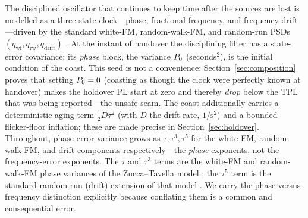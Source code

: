 The disciplined oscillator that continues to keep time after the sources are lost
is modelled as a three-state clock---phase, fractional frequency, and
frequency drift---driven by the standard white-FM, random-walk-FM, and
random-run PSDs $(q_{\mathrm{wf}},q_{\mathrm{rw}},q_{\mathrm{drift}})$
\citep{zucca2005,riley2008,ieee1139}. At the instant of handover the disciplining
filter has a state-error covariance; its \emph{phase} block, the variance
$P_0$ (seconds$^2$), is the initial condition of the coast. This seed is not a
convenience: Section~\ref{sec:composition} proves that setting $P_0=0$ (coasting
as though the clock were perfectly known at handover) makes the holdover PL start
at zero and thereby \emph{drop} below the TPL that was being reported---the unsafe
seam. The coast additionally carries a deterministic aging term
$\tfrac12 D\tau^{2}$ (with $D$ the drift rate, $1/\mathrm{s}^2$) and a bounded
flicker-floor inflation; these are made precise in Section~\ref{sec:holdover}.
Throughout, phase-error variance grows as $\tau,\tau^{3},\tau^{5}$ for the
white-FM, random-walk-FM, and drift components respectively---the \emph{phase}
exponents, not the frequency-error exponents. The $\tau$ and $\tau^{3}$ terms are
the white-FM and random-walk-FM phase variances of the Zucca--Tavella model
\citep{zucca2005}; the $\tau^{5}$ term is the standard random-run (drift) extension
of that model \citep{riley2008,ieee1139}. We carry the phase-versus-frequency
distinction explicitly because conflating them is a common and consequential error.
